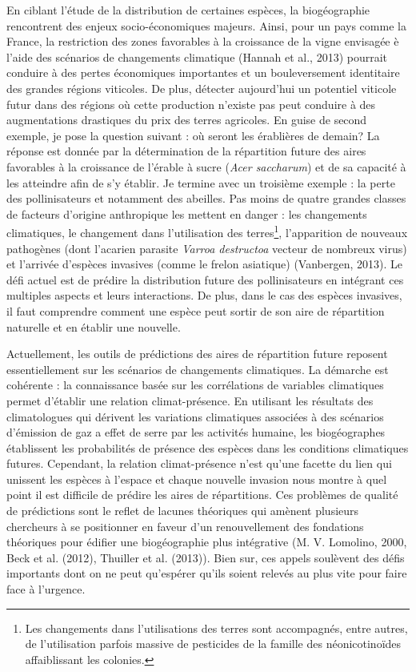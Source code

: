En ciblant l'étude de la distribution de certaines espèces, la
biogéographie rencontrent des enjeux socio-économiques majeurs. Ainsi,
pour un pays comme la France, la restriction des zones favorables à la
croissance de la vigne envisagée è l'aide des scénarios de changements
climatique (Hannah et al., 2013) pourrait conduire à des pertes
économiques importantes et un bouleversement identitaire des grandes
régions viticoles. De plus, détecter aujourd'hui un potentiel viticole
futur dans des régions où cette production n'existe pas peut conduire à
des augmentations drastiques du prix des terres agricoles. En guise de
second exemple, je pose la question suivant : où seront les érablières
de demain? La réponse est donnée par la détermination de la répartition
future des aires favorables à la croissance de l'érable à sucre
(\emph{Acer saccharum}) et de sa capacité à les atteindre afin de s'y
établir. Je termine avec un troisième exemple : la perte des
pollinisateurs et notamment des abeilles. Pas moins de quatre grandes
classes de facteurs d'origine anthropique les mettent en danger : les
changements climatiques, le changement dans l'utilisation des
terres\footnote{Les changements dans l'utilisations des terres sont
  accompagnés, entre autres, de l'utilisation parfois massive de
  pesticides de la famille des néonicotinoïdes affaiblissant les
  colonies.}, l'apparition de nouveaux pathogènes (dont l'acarien
parasite \emph{Varroa destructoa} vecteur de nombreux virus) et
l'arrivée d'espèces invasives (comme le frelon asiatique) (Vanbergen,
2013). Le défi actuel est de prédire la distribution future des
pollinisateurs en intégrant ces multiples aspects et leurs interactions.
De plus, dans le cas des espèces invasives, il faut comprendre comment
une espèce peut sortir de son aire de répartition naturelle et en
établir une nouvelle.

Actuellement, les outils de prédictions des aires de répartition future
reposent essentiellement sur les scénarios de changements climatiques.
La démarche est cohérente : la connaissance basée sur les corrélations
de variables climatiques permet d'établir une relation climat-présence.
En utilisant les résultats des climatologues qui dérivent les variations
climatiques associées à des scénarios d'émission de gaz a effet de serre
par les activités humaine, les biogéographes établissent les
probabilités de présence des espèces dans les conditions climatiques
futures. Cependant, la relation climat-présence n'est qu'une facette du
lien qui unissent les espèces à l'espace et chaque nouvelle invasion
nous montre à quel point il est difficile de prédire les aires de
répartitions. Ces problèmes de qualité de prédictions sont le reflet de
lacunes théoriques qui amènent plusieurs chercheurs à se positionner en
faveur d'un renouvellement des fondations théoriques pour édifier une
biogéographie plus intégrative (M. V. Lomolino, 2000, Beck et al.
(2012), Thuiller et al. (2013)). Bien sur, ces appels soulèvent des
défis importants dont on ne peut qu'espérer qu'ils soient relevés au
plus vite pour faire face à l'urgence.

